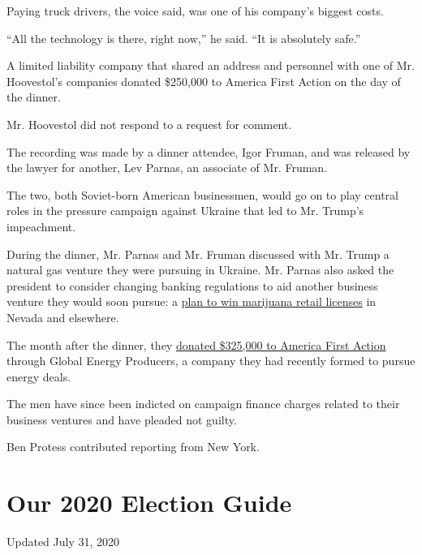 Paying truck drivers, the voice said, was one of his company's biggest
costs.

``All the technology is there, right now,'' he said. ``It is absolutely
safe.''

A limited liability company that shared an address and personnel with
one of Mr. Hoovestol's companies donated \$250,000 to America First
Action on the day of the dinner.

Mr. Hoovestol did not respond to a request for comment.

The recording was made by a dinner attendee, Igor Fruman, and was
released by the lawyer for another, Lev Parnas, an associate of Mr.
Fruman.

The two, both Soviet-born American businessmen, would go on to play
central roles in the pressure campaign against Ukraine that led to Mr.
Trump's impeachment.

During the dinner, Mr. Parnas and Mr. Fruman discussed with Mr. Trump a
natural gas venture they were pursuing in Ukraine. Mr. Parnas also asked
the president to consider changing banking regulations to aid another
business venture they would soon pursue: a
\href{https://www.nytimes.com/2019/10/23/us/kukushkin-giuliani-russia-cannabis-marijuana.html}{plan
to win marijuana retail licenses} in Nevada and elsewhere.

The month after the dinner, they
\href{http://docquery.fec.gov/cgi-bin/fecimg/?201807159115673127}{donated
\$325,000 to America First Action} through Global Energy Producers, a
company they had recently formed to pursue energy deals.

The men have since been indicted on campaign finance charges related to
their business ventures and have pleaded not guilty.

Ben Protess contributed reporting from New York.

\hypertarget{our-2020-election-guide}{%
\section{Our 2020 Election Guide}\label{our-2020-election-guide}}

Updated July 31, 2020

